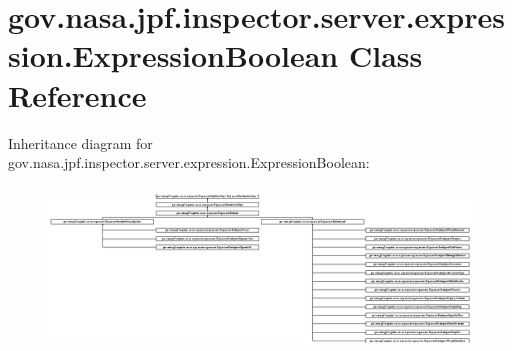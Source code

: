 \hypertarget{classgov_1_1nasa_1_1jpf_1_1inspector_1_1server_1_1expression_1_1_expression_boolean}{}\section{gov.\+nasa.\+jpf.\+inspector.\+server.\+expression.\+Expression\+Boolean Class Reference}
\label{classgov_1_1nasa_1_1jpf_1_1inspector_1_1server_1_1expression_1_1_expression_boolean}
Inheritance diagram for gov.\+nasa.\+jpf.\+inspector.\+server.\+expression.\+Expression\+Boolean\+:\begin{figure}[H]
\begin{center}
\leavevmode
\includegraphics[height=4.344828cm]{classgov_1_1nasa_1_1jpf_1_1inspector_1_1server_1_1expression_1_1_expression_boolean}
\end{center}
\end{figure}
